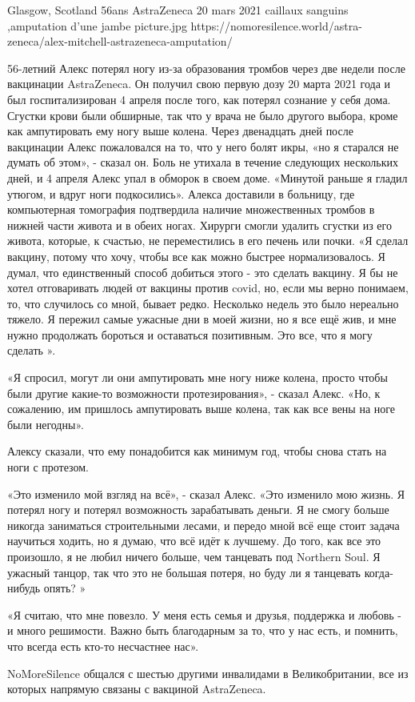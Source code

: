           {Glasgow, Scotland}
          {56ans}
          {AstraZeneca}
          {20 mars 2021}
          {caillaux sanguins
            ,amputation d'une jambe
          }
          {picture.jpg}
          {https://nomoresilence.world/astra-zeneca/alex-mitchell-astrazeneca-amputation/}
          {

56-летний Алекс потерял ногу из-за образования тромбов через две недели после
вакцинации AstraZeneca. Он получил свою первую дозу 20 марта 2021 года и был
госпитализирован 4 апреля после того, как потерял сознание у себя дома. Сгустки
крови были обширные, так что у врача не было другого выбора, кроме как
ампутировать ему ногу выше колена. Через двенадцать дней после вакцинации Алекс
пожаловался на то, что у него болят икры, «но я старался не думать об этом», -
сказал он. Боль не утихала в течение следующих нескольких дней, и 4 апреля Алекс
упал в обморок в своем доме. «Минутой раньше я гладил утюгом, и вдруг ноги
подкосились». Алекса доставили в больницу, где компьютерная томография
подтвердила наличие множественных тромбов в нижней части живота и в обеих
ногах. Хирурги смогли удалить сгустки из его живота, которые, к счастью, не
переместились в его печень или почки. «Я сделал вакцину, потому что хочу, чтобы
все как можно быстрее нормализовалось. Я думал, что единственный способ добиться
этого - это сделать вакцину. Я бы не хотел отговаривать людей от вакцины против
covid, но, если мы верно понимаем, то, что случилось со мной, бывает
редко. Несколько недель это было нереально тяжело. Я пережил самые ужасные дни в
моей жизни, но я все ещё жив, и мне нужно продолжать бороться и оставаться
позитивным. Это все, что я могу сделать ».

«Я спросил, могут ли они ампутировать мне ногу ниже колена, просто чтобы были
другие какие-то возможности протезирования», - сказал Алекс. «Но, к сожалению,
им пришлось ампутировать выше колена, так как все вены на ноге были негодны».

Алексу сказали, что ему понадобится как минимум год, чтобы снова стать на ноги с
протезом.

«Это изменило мой взгляд на всё», - сказал Алекс. «Это изменило мою жизнь. Я
потерял ногу и потерял возможность зарабатывать деньги. Я не смогу больше
никогда заниматься строительными лесами, и передо мной всё еще стоит задача
научиться ходить, но я думаю, что всё идёт к лучшему. До того, как все это
произошло, я не любил ничего больше, чем танцевать под Northern Soul. Я ужасный
танцор, так что это не большая потеря, но буду ли я танцевать когда-нибудь
опять? »

«Я считаю, что мне повезло. У меня есть семья и друзья, поддержка и любовь - и
много решимости. Важно быть благодарным за то, что у нас есть, и помнить, что
всегда есть кто-то несчастнее нас».

NoMoreSilence общался с шестью другими инвалидами в Великобритании, все из
которых напрямую связаны с вакциной AstraZeneca.

}
